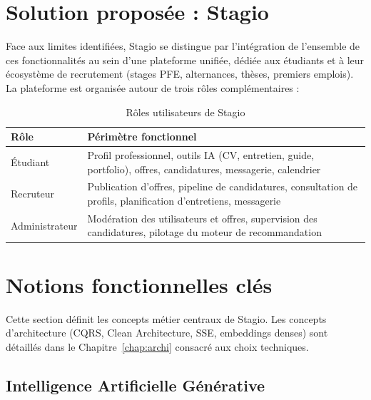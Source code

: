 ﻿\documentclass[12pt,a4paper]{report}
\begin{document}
\section{Solution proposée : Stagio}

Face aux limites identifiées, Stagio se distingue par l'intégration de l'ensemble de ces fonctionnalités au sein d'une plateforme unifiée, dédiée aux étudiants et à leur écosystème de recrutement (stages PFE, alternances, thèses, premiers emplois). La plateforme est organisée autour de trois rôles complémentaires :

\begin{table}[H]
\centering
\begin{tabularx}{\textwidth}{lX}
\toprule
\textbf{Rôle} & \textbf{Périmètre fonctionnel} \\
\midrule
Étudiant & Profil professionnel, outils IA (CV, entretien, guide, portfolio), offres, candidatures, messagerie, calendrier \\
Recruteur & Publication d'offres, pipeline de candidatures, consultation de profils, planification d'entretiens, messagerie \\
Administrateur & Modération des utilisateurs et offres, supervision des candidatures, pilotage du moteur de recommandation \\
\bottomrule
\end{tabularx}
\caption{Rôles utilisateurs de Stagio}
\end{table}

\section{Notions fonctionnelles clés}

Cette section définit les concepts métier centraux de Stagio. Les concepts d'architecture (CQRS, Clean Architecture, SSE, embeddings denses) sont détaillés dans le Chapitre~\ref{chap:archi} consacré aux choix techniques.

\subsection{Intelligence Artificielle Générative}
\end{document}
